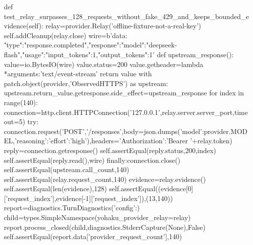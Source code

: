     def test_relay_surpasses_128_requests_without_fake_429_and_keeps_bounded_evidence(self):
        relay=provider.Relay('offline-fixture-not-a-real-key')
        self.addCleanup(relay.close)
        wire=b'data: {"type":"response.completed","response":{"model":"deepseek-flash","usage":{"input_tokens":1,"output_tokens":1}}}\n\n'
        def upstream_response():
            value=io.BytesIO(wire)
            value.status=200
            value.getheader=lambda *arguments:'text/event-stream'
            return value
        with patch.object(provider,'ObservedHTTPS') as upstream:
            upstream.return_value.getresponse.side_effect=upstream_response
            for index in range(140):
                connection=http.client.HTTPConnection('127.0.0.1',relay.server.server_port,timeout=5)
                try:
                    connection.request('POST','/responses',body=json.dumps({'model':provider.MODEL,'reasoning':{'effort':'high'}}),headers={'Authorization':'Bearer '+relay.token})
                    reply=connection.getresponse()
                    self.assertEqual(reply.status,200,index)
                    self.assertEqual(reply.read(),wire)
                finally:connection.close()
            self.assertEqual(upstream.call_count,140)
        self.assertEqual(relay.request_count,140)
        evidence=relay.evidence()
        self.assertEqual(len(evidence),128)
        self.assertEqual((evidence[0]['request_index'],evidence[-1]['request_index']),(13,140))
        report=diagnostics.TurnDiagnostics({'config':{}})
        child=types.SimpleNamespace(yohaku_provider_relay=relay)
        report.process_closed(child,diagnostics.StderrCapture(None),False)
        self.assertEqual(report.data['provider_request_count'],140)

